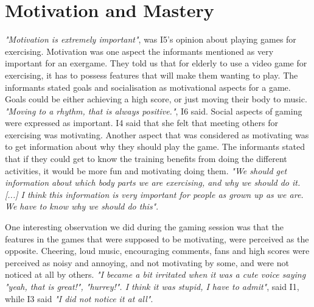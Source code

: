 \section{Motivation and Mastery}

\emph{"Motivation is extremely important"}, was I5's opinion about playing games for exercising. Motivation was one aspect the informants mentioned as very important for an exergame. They told us that for elderly to use a video game for exercising, it has to possess features that will make them wanting to play. The informants stated goals and socialisation as motivational aspects for a game. Goals could be either achieving a high score, or just moving their body to music. \emph{"Moving to a rhythm, that is always positive."}, I6 said. Social aspects of gaming were expressed as important. I4 said that she felt that meeting others for exercising was motivating. Another aspect that was considered as motivating was to get information about why they should play the game. The informants stated that if they could get to know the training benefits from doing the different activities, it would be more fun and motivating doing them. \emph{"We should get information about which body parts we are exercising, and why we should do it. [...] I think this information is very important for people as grown up as we are. We have to know why we should do this"}. 

One interesting observation we did during the gaming session was that the features in the games that were supposed to be motivating, were perceived as the opposite. Cheering, loud music, encouraging comments, fans and high scores were perceived as noisy and annoying, and not motivating by some, and were not noticed at all by others. \emph{"I became a bit irritated when it was a cute voice saying "yeah, that is great!", "hurrey!". I think it was stupid, I have to admit"}, said I1, while I3 said \emph{"I did not notice it at all"}. 

